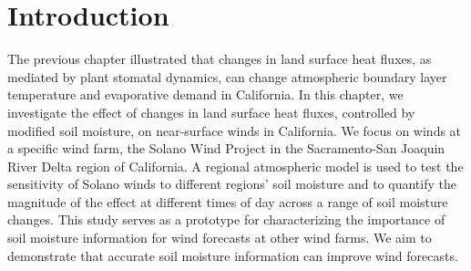 
%
%
%
%
%

\section{Introduction}

The previous chapter illustrated that changes in land surface heat fluxes, as mediated by plant stomatal dynamics, can change atmospheric boundary layer temperature and evaporative demand in California.  In this chapter, we investigate the effect of changes in land surface heat fluxes, controlled by modified soil moisture, on near-surface winds in California.  We focus on winds at a specific wind farm, the Solano Wind Project in the Sacramento-San Joaquin River Delta region of California.  A regional atmospheric model is used to test the sensitivity of Solano winds to different regions' soil moisture and to quantify the magnitude of the effect at different times of day across a range of soil moisture changes.  This study serves as a prototype for characterizing the importance of soil moisture information for wind forecasts at other wind farms.  We aim to demonstrate that accurate soil moisture information can improve wind forecasts.

